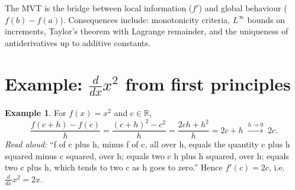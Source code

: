 \documentclass[11pt]{article}
\theoremstyle{definition}
\newtheorem{example}[theorem]{Example}
\theoremstyle{remark}
\begin{document}
The MVT is the bridge between local information ($f'$) and global behaviour
($f(b) - f(a)$). Consequences include: monotonicity criteria, $L^\infty$
bounds on increments, Taylor's theorem with Lagrange remainder, and the
uniqueness of antiderivatives up to additive constants.

\section{Example: $\frac{d}{dx} x^2$ from first principles}

\begin{example}
For $f(x) = x^2$ and $c \in \mathbb{R}$,
\[
\frac{f(c+h) - f(c)}{h}
= \frac{(c+h)^2 - c^2}{h}
= \frac{2ch + h^2}{h}
= 2c + h
\;\xrightarrow{h \to 0}\; 2c.
\]
\emph{Read aloud:} ``f of c plus h, minus f of c, all over h, equals the quantity c plus h squared minus c squared, over h; equals two c h plus h squared, over h; equals two c plus h, which tends to two c as h goes to zero.''
Hence $f'(c) = 2c$, i.e.\ $\tfrac{d}{dx} x^2 = 2x$.
\end{example}
\end{document}
